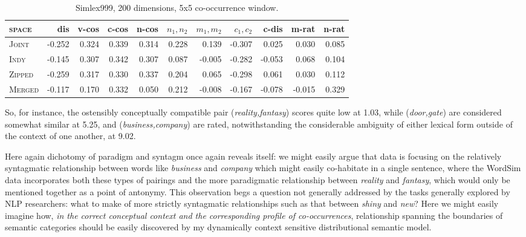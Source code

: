 \begin{table}
\begin{tabular}{lrrrrrrrrrr}
\hline
\textsc{space} & dis & v-cos & c-cos & n-cos & $n_1,n_2$ & $m_1,m_2$ & $c_1,c_2$ & c-dis & m-rat & n-rat \\
\hline
\textsc{Joint} & -0.252 & 0.324 & 0.339 & 0.314 & 0.228 & 0.139 & -0.307 & 0.025 & 0.030 & 0.085 \\
\textsc{Indy} & -0.145 & 0.307 & 0.342 & 0.307 & 0.087 & -0.005 & -0.282 & -0.053 & 0.068 & 0.104 \\
\textsc{Zipped} & -0.259 & 0.317 & 0.330 & 0.337 & 0.204 & 0.065 & -0.298 & 0.061 & 0.030 & 0.112 \\
\textsc{Merged} & -0.117 & 0.170 & 0.332 & 0.050 & 0.212 & -0.008 & -0.167 & -0.078 & -0.015 & 0.329 \\
\hline
\end{tabular}
\caption{Simlex999, 200 dimensions, 5x5 co-occurrence window.}
\end{table}

So, for instance, the ostensibly conceptually compatible pair (\emph{reality,fantasy}) scores quite low at 1.03, while (\emph{door,gate}) are considered somewhat similar at 5.25, and (\emph{business,company}) are rated, notwithstanding the considerable ambiguity of either lexical form outside of the context of one another, at 9.02.

Here again  dichotomy of paradigm and syntagm once again reveals itself: we might easily argue that  data is focusing on the relatively syntagmatic relationship between words like \emph{business} and \emph{company} which might easily co-habitate in a single sentence, where the WordSim data incorporates both these types of pairings and the more paradigmatic relationship between \emph{reality} and \emph{fantasy}, which would only be mentioned together as a point of antonymy.  This observation begs a question not generally addressed by the tasks generally explored by NLP researchers: what to make of more strictly syntagmatic relationships such as that between \emph{shiny} and \emph{new}?  Here we might easily imagine how, \emph{in the correct conceptual context and the corresponding profile of co-occurrences}, relationship spanning the boundaries of semantic categories should be easily discovered by my dynamically context sensitive distributional semantic model.
